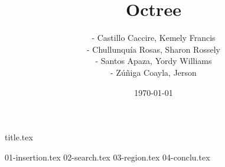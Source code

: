 \documentclass[a4paper,12pt]{article}
\title{Octree}
\author{- Castillo Caccire, Kemely Francis\\
        - Chullunquía Rosas, Sharon Rossely\\
        - Santos Apaza, Yordy Williams\\
        - Zúñiga Coayla, Jerson}
\date{\today}
\begin{document}
{title.tex}

\tableofcontents
\newpage

{01-insertion.tex}
{02-search.tex}
{03-region.tex}
{04-conclu.tex}

\printbibliography[heading=bibintoc]
\end{document}
